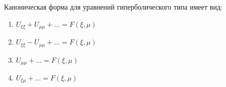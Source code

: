 Каноническая форма для уравнений гиперболического типа имеет вид:

\begin{enumerate}[label=\arabic*)]
    \item \(U_{\xi \xi }+U_{\mu \mu }+\dots =F\left(\xi ,\mu \right)\)
    \item \(U_{\xi \xi }-U_{\mu \mu }+\dots =F\left(\xi ,\mu \right)\)
    \item \(U_{\mu \mu }+\dots =F\left(\xi ,\mu \right)\)
    \item \(U_{\xi \mu }+\dots =F\left(\xi ,\mu \right)\)
\end{enumerate}

